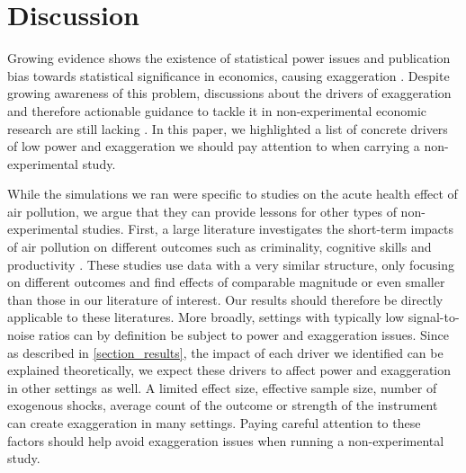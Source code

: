 \documentclass[12pt]{article}
\begin{document}



\section{Discussion}\label{section_discussion}

        \begin{sloppypar}
        Growing evidence shows the existence of statistical power issues and publication bias towards statistical significance in economics, causing exaggeration \citep{brodeur_star_2016, ioannidis_power_2017, brodeur_methods_2020, ferraro_feature_2020}. Despite growing awareness of this problem, discussions about the drivers of exaggeration and therefore actionable guidance to tackle it in non-experimental economic research are still lacking \citep{altoe_enhancing_2020, black_simulated_2022}. In this paper, we highlighted a list of concrete drivers of low power and exaggeration we should pay attention to when carrying a non-experimental study. %
        \end{sloppypar}

        While the simulations we ran were specific to studies on the acute health effect of air pollution, we argue that they can provide lessons for other types of non-experimental studies. First, a large literature investigates the short-term impacts of air pollution on different outcomes such as criminality, cognitive skills and productivity \citep[for instance]{herrnstadt_air_2021, ebenstein_long-run_2016, adhvaryu2022management}. These studies use data with a very similar structure, only focusing on different outcomes and find effects of comparable magnitude or even smaller than those in our literature of interest. Our results should therefore be directly applicable to these literatures. More broadly, settings with typically low signal-to-noise ratios can by definition be subject to power and exaggeration issues. Since as described in \cref{section_results}, the impact of each driver we identified can be explained theoretically, we expect these drivers to affect power and exaggeration in other settings as well. A limited effect size, effective sample size, number of exogenous shocks, average count of the outcome or strength of the instrument can create exaggeration in many settings. Paying careful attention to these factors should help avoid exaggeration issues when running a non-experimental study.
        
\end{document}
